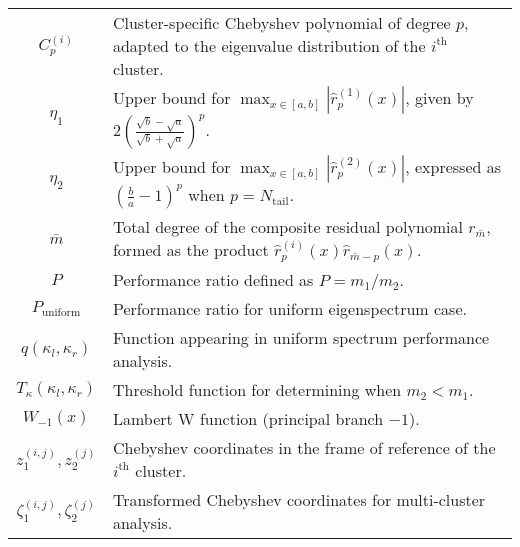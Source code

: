 \begin{longtable}{c p{10cm}}
    $C^{(i)}_{p}$                    & Cluster-specific Chebyshev polynomial of degree $p$, adapted to the eigenvalue distribution of the $i^\text{th}$ cluster.                                          \\
    $\eta_1$                         & Upper bound for $\max_{x \in [a,b]} |\hat{r}^{(1)}_p(x)|$, given by $2\left(\frac{\sqrt{b}-\sqrt{a}}{\sqrt{b}+\sqrt{a}}\right)^p$.                                 \\
    $\eta_2$                         & Upper bound for $\max_{x \in [a,b]} |\hat{r}^{(2)}_p(x)|$, expressed as $\left(\frac{b}{a}-1\right)^p$ when $p=N_{\text{tail}}$.                                   \\
    $\bar{m}$                        & Total degree of the composite residual polynomial $r_{\bar{m}}$, formed as the product $\hat{r}^{(i)}_p(x)\hat{r}_{\bar{m}-p}(x)$.                                 \\
    $P$                              & Performance ratio defined as $P = m_1/m_2$.                                                                                                                        \\
    $P_{\text{uniform}}$             & Performance ratio for uniform eigenspectrum case.                                                                                                                  \\
    $q(\kappa_l, \kappa_r)$          & Function appearing in uniform spectrum performance analysis.                                                                                                       \\
    $T_{\kappa}(\kappa_l, \kappa_r)$ & Threshold function for determining when $m_2 < m_1$.                                                                                                               \\
    $W_{-1}(x)$                      & Lambert W function (principal branch $-1$).                                                                                                                        \\
    $z^{(i,j)}_1, z^{(j)}_2$         & Chebyshev coordinates in the frame of reference of the $i^{\text{th}}$ cluster.                                                                                    \\
    $\zeta^{(i,j)}_1, \zeta^{(j)}_2$ & Transformed Chebyshev coordinates for multi-cluster analysis.                                                                                                      \\

\end{longtable}
